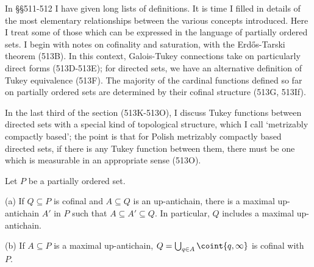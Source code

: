 
\def\chaptername{Cardinal functions}
\def\sectionname{Partially ordered sets}


In \S\S511-512 I have given long
lists of definitions.   It is time I filled in details of
the most elementary relationships between the various concepts
introduced.   Here I treat some of those which can be expressed in the
language of partially ordered sets.   I begin with notes on cofinality
and saturation, with the Erd\H{o}s-Tarski theorem (513B).
In this context, Galois-Tukey connections take on particularly direct
forms (513D-513E);  for directed sets, we have an alternative definition
of Tukey equivalence (513F).   The majority of the cardinal functions
defined so far on partially ordered sets are determined by their cofinal
structure (513G, 513If).

In the last third of the section
(513K-513O), %
I discuss Tukey functions between directed sets with a special kind of
topological structure, which I call `metrizably compactly based';  the
point is
that for Polish metrizably compactly based directed sets, if there is
any Tukey function between them, there must be one
which is measurable in an appropriate sense (513O).

 Let $P$ be a partially ordered set.

(a) If $Q\subseteq P$ is cofinal and $A\subseteq Q$ is an up-antichain,
there is a maximal up-antichain $A'$ in $P$ such that
$A\subseteq A'\subseteq Q$.   In particular, $Q$ includes a maximal
up-antichain.

(b) If $A\subseteq P$ is a maximal up-antichain,
$Q=\bigcup_{q\in A}\coint{q,\infty}$ is cofinal with $P$.


